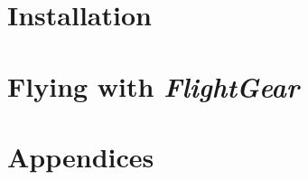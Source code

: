 \documentclass[11pt,a4paper]{book}
\newcommand{\FlightGear}{{\itshape\bfseries FlightGear}}
\begin{document}


\part{Installation}


\part{Flying with \FlightGear{}}


\part{Appendices}
\begin{appendix}




\end{appendix}


\end{document}
